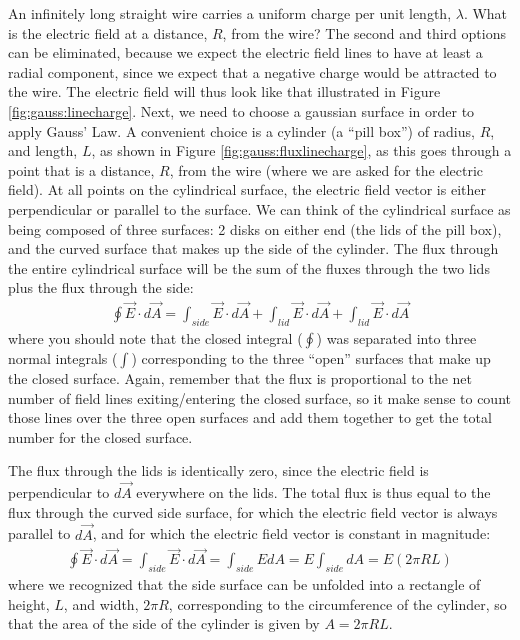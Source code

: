 \begin{example}{An infinitely long straight wire carries a uniform charge per unit length, $\lambda$. What is the electric field at a distance, $R$, from the wire?}
The second and third options can be eliminated, because we expect the electric field lines to have at least a radial component, since we expect that a negative charge would be attracted to the wire. The electric field will thus look like that illustrated in Figure \ref{fig:gauss:linecharge}.
Next, we need to choose a gaussian surface in order to apply Gauss' Law. A convenient choice is a cylinder (a ``pill box'') of radius, $R$, and length, $L$, as shown in Figure \ref{fig:gauss:fluxlinecharge}, as this goes through a point that is a distance, $R$, from the wire (where we are asked for the electric field). At all points on the cylindrical surface, the electric field vector is either perpendicular or parallel to the surface.
We can think of the cylindrical surface as being composed of three surfaces: 2 disks on either end (the lids of the pill box), and the curved surface that makes up the side of the cylinder. The flux through the entire cylindrical surface will be the sum of the fluxes through the two lids plus the flux through the side:
\begin{align*}
\oint \vec E\cdot d\vec A = \int_{side} \vec E\cdot d\vec A + \int_{lid}\vec E\cdot d\vec A + \int_{lid}\vec E\cdot d\vec A
\end{align*}
where you should note that the closed integral ($\oint$) was separated into three normal integrals ($\int$) corresponding to the three ``open'' surfaces that make up the closed surface. Again, remember that the flux is proportional to the net number of field lines exiting/entering the closed surface, so it make sense to count those lines over the three open surfaces and add them together to get the total number for the closed surface.

The flux through the lids is identically zero, since the electric field is perpendicular to $d\vec A$ everywhere on the lids. The total flux is thus equal to the flux through the curved side surface, for which the electric field vector is always parallel to $d\vec A$, and for which the electric field vector is constant in magnitude:
\begin{align*}
\oint \vec E\cdot d\vec A = \int_{side} \vec E\cdot d\vec A =\int_{side} EdA=E\int_{side}dA=E(2\pi R L)
\end{align*}
where we recognized that the side surface can be unfolded into a rectangle of height, $L$, and width, $2\pi R$, corresponding to the circumference of the cylinder, so that the area of the side of the cylinder is given by $A=2\pi R L$. 


\end{example}
